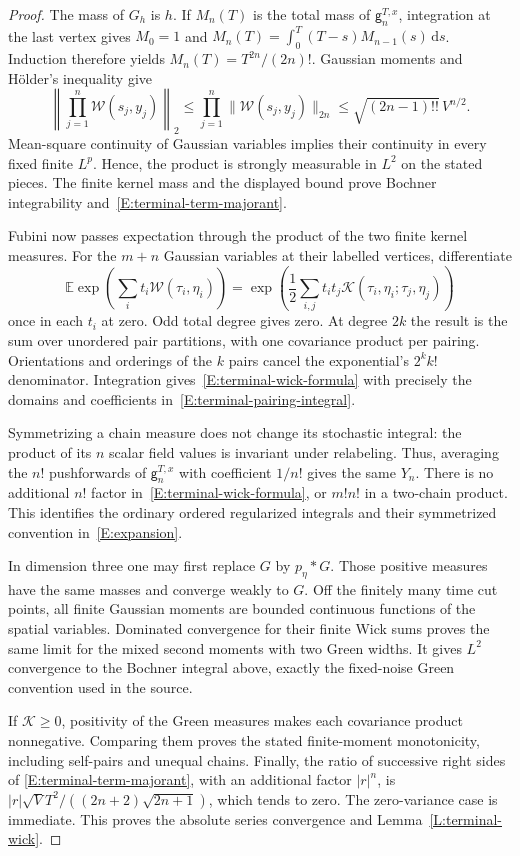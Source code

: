 \documentclass[12pt]{article}
\numberwithin{equation}{section}
\theoremstyle{definition}
\newcommand{\E}{\mathbb{E}}
\newcommand{\ud}{\,\mathrm{d}}
\begin{document}
\begin{proof}
  The mass of $G_h$ is $h$. If $M_n(T)$ is the total mass of
  $\mathsf g_n^{T,x}$, integration at the last vertex gives
  $M_0=1$ and $M_n(T)=\int_0^T(T-s)M_{n-1}(s)\ud s$.
  Induction therefore yields $M_n(T)=T^{2n}/(2n)!$.
  Gaussian moments and H\"older's inequality give
  \[
    \left\|\prod_{j=1}^n\mathcal W(s_j,y_j)\right\|_2
    \le\prod_{j=1}^n\|\mathcal W(s_j,y_j)\|_{2n}
    \le\sqrt{(2n-1)!!}\,V^{n/2}.
  \]
  Mean-square continuity of Gaussian variables implies their continuity
  in every fixed finite $L^p$. Hence, the product is strongly measurable
  in $L^2$ on the stated pieces. The finite kernel mass and the displayed
  bound prove Bochner integrability and~\eqref{E:terminal-term-majorant}.

  Fubini now passes expectation through the product of the two finite
  kernel measures. For the $m+n$ Gaussian variables at their labelled
  vertices, differentiate
  \[
    \E\exp\left(\sum_i t_i\mathcal W(\tau_i,\eta_i)\right)
    =\exp\left(\frac12\sum_{i,j}t_i t_j
    \mathcal K(\tau_i,\eta_i;\tau_j,\eta_j)\right)
  \]
  once in each $t_i$ at zero. Odd total degree gives zero.
  At degree $2k$ the result is the sum over unordered pair partitions,
  with one covariance product per pairing. Orientations and orderings
  of the $k$ pairs cancel the exponential's $2^k k!$ denominator.
  Integration gives~\eqref{E:terminal-wick-formula} with precisely
  the domains and coefficients in~\eqref{E:terminal-pairing-integral}.

  Symmetrizing a chain measure does not change its stochastic integral:
  the product of its $n$ scalar field values is invariant under relabeling.
  Thus, averaging the $n!$ pushforwards of $\mathsf g_n^{T,x}$ with
  coefficient $1/n!$ gives the same $Y_n$. There is no additional $n!$
  factor in~\eqref{E:terminal-wick-formula}, or $m!n!$ in a two-chain
  product. This identifies the ordinary ordered regularized integrals
  and their symmetrized convention in~\eqref{E:expansion}.

  In dimension three one may first replace $G$ by $p_\eta*G$.
  Those positive measures have the same masses and converge weakly to
  $G$. Off the finitely many time cut points, all finite Gaussian moments
  are bounded continuous functions of the spatial variables. Dominated
  convergence for their finite Wick sums proves the same limit for
  the mixed second moments with two Green widths. It gives $L^2$
  convergence to the Bochner integral above, exactly the fixed-noise
  Green convention used in the source.

  If $\mathcal K\ge0$, positivity of the Green measures makes each
  covariance product nonnegative. Comparing them proves the stated
  finite-moment monotonicity, including self-pairs and unequal chains.
  Finally, the ratio of successive right sides of
  \eqref{E:terminal-term-majorant}, with an additional factor $|r|^n$,
  is $|r|\sqrt V T^2/((2n+2)\sqrt{2n+1})$, which tends to zero.
  The zero-variance case is immediate. This proves the absolute series
  convergence and Lemma~\ref{L:terminal-wick}.
\end{proof}
\end{document}
